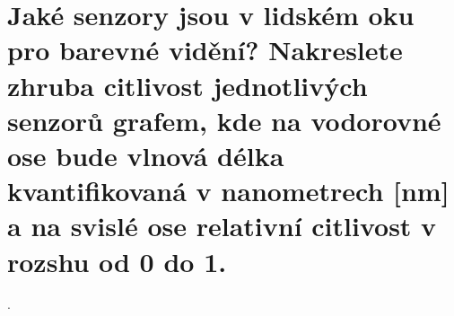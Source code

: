 \section{Jaké senzory jsou v lidském oku pro barevné vidění? Nakreslete zhruba citlivost jednotlivých senzorů grafem, 
kde na vodorovné ose bude vlnová délka kvantifikovaná v nanometrech [nm] a na svislé ose relativní citlivost v rozshu od 
0 do 1.}.
